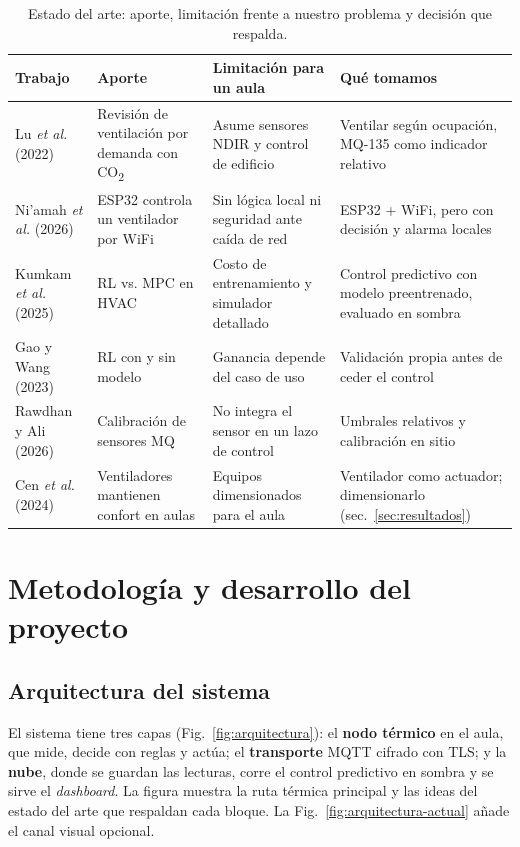 \documentclass[10pt,a4paper]{article}
\newcommand{\COd}{CO\textsubscript{2}}
\begin{document}
\begin{table}[H]
\centering\scriptsize
\caption{Estado del arte: aporte, limitación frente a nuestro problema y decisión que respalda.}
\label{tab:arte}
\begin{tabularx}{\linewidth}{L{2.4cm}XXX}
\toprule
\textbf{Trabajo} & \textbf{Aporte} & \textbf{Limitación para un aula} & \textbf{Qué tomamos} \\
\midrule
Lu \emph{et al.} (2022)~\cite{lu} & Revisión de ventilación por demanda con \COd{} & Asume sensores NDIR y control de edificio & Ventilar según ocupación, MQ-135 como indicador relativo \\
Ni'amah \emph{et al.} (2026)~\cite{niamah} & ESP32 controla un ventilador por WiFi & Sin lógica local ni seguridad ante caída de red & ESP32 + WiFi, pero con decisión y alarma locales \\
Kumkam \emph{et al.} (2025)~\cite{kumkam} & RL vs. MPC en HVAC & Costo de entrenamiento y simulador detallado & Control predictivo con modelo preentrenado, evaluado en sombra \\
Gao y Wang (2023)~\cite{gao} & RL con y sin modelo & Ganancia depende del caso de uso & Validación propia antes de ceder el control \\
Rawdhan y Ali (2026)~\cite{rawdhan} & Calibración de sensores MQ & No integra el sensor en un lazo de control & Umbrales relativos y calibración en sitio \\
Cen \emph{et al.} (2024)~\cite{cen} & Ventiladores mantienen confort en aulas & Equipos dimensionados para el aula & Ventilador como actuador; dimensionarlo (sec.~\ref{sec:resultados}) \\
\bottomrule
\end{tabularx}
\end{table}

\section{Metodología y desarrollo del proyecto}
\subsection{Arquitectura del sistema}
El sistema tiene tres capas (Fig.~\ref{fig:arquitectura}): el \textbf{nodo térmico} en el aula, que mide, decide con reglas y actúa; el \textbf{transporte} MQTT cifrado con TLS; y la \textbf{nube}, donde se guardan las lecturas, corre el control predictivo en sombra y se sirve el \emph{dashboard}. La figura muestra la ruta térmica principal y las ideas del estado del arte que respaldan cada bloque. La Fig.~\ref{fig:arquitectura-actual} añade el canal visual opcional.
\end{document}
